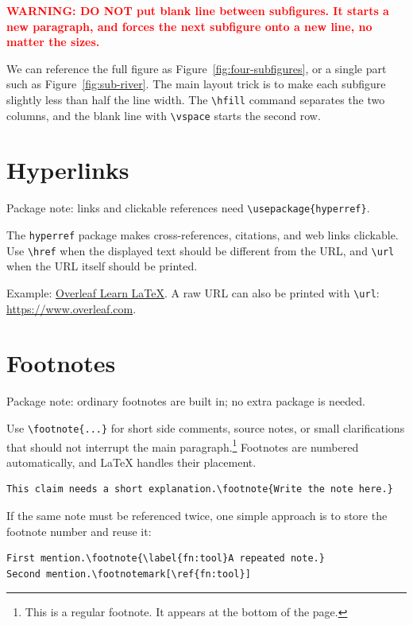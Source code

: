 \documentclass[11pt,a4paper]{article}
\begin{document}
\textbf{\textcolor{red}{WARNING: DO NOT put blank line between subfigures. It starts a new paragraph, and forces the next subfigure onto a new line, no matter the sizes.}}

We can reference the full figure as Figure~\ref{fig:four-subfigures}, or a
single part such as Figure~\ref{fig:sub-river}. The main layout trick is to
make each subfigure slightly less than half the line width. The \verb|\hfill|
command separates the two columns, and the blank line with \verb|\vspace|
starts the second row.

\section{Hyperlinks}

Package note: links and clickable references need \verb|\usepackage{hyperref}|.

The \texttt{hyperref} package makes cross-references, citations, and web links
clickable. Use \verb|\href| when the displayed text should be different from
the URL, and \verb|\url| when the URL itself should be printed.

Example: \href{https://www.overleaf.com/learn/latex/Main_Page}{Overleaf Learn
LaTeX}. A raw URL can also be printed with \verb|\url|:
\url{https://www.overleaf.com}.

\section{Footnotes}

Package note: ordinary footnotes are built in; no extra package is needed.

Use \verb|\footnote{...}| for short side comments, source notes, or small
clarifications that should not interrupt the main paragraph.\footnote{This is a
regular footnote. It appears at the bottom of the page.} Footnotes are numbered
automatically, and LaTeX handles their placement.

\begin{verbatim}
This claim needs a short explanation.\footnote{Write the note here.}
\end{verbatim}

If the same note must be referenced twice, one simple approach is to store the
footnote number and reuse it:

\begin{verbatim}
First mention.\footnote{\label{fn:tool}A repeated note.}
Second mention.\footnotemark[\ref{fn:tool}]
\end{verbatim}
\end{document}
